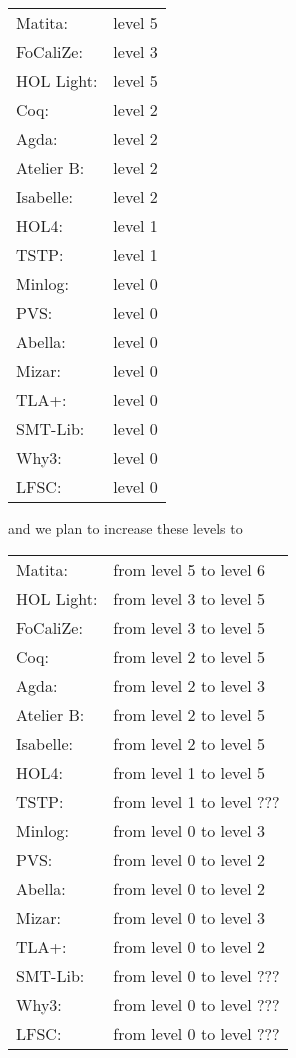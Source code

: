 \begin{tabular}{ll}
Matita:& level 5\\
FoCaliZe:& level 3\\
HOL Light:& level 5\\
Coq:& level 2\\
Agda:& level 2\\
Atelier B:& level 2\\
Isabelle:& level 2\\
HOL4:& level 1\\
TSTP:& level 1\\
Minlog:& level 0\\
PVS:& level 0\\
Abella:& level 0\\
Mizar:& level 0\\
TLA+:& level 0\\
SMT-Lib:& level 0\\
Why3:& level 0\\
LFSC:& level 0\\

\end{tabular}

and we plan to increase these levels to 

\begin{tabular}{ll}
Matita:& from level 5 to level 6\\
HOL Light:& from level 3 to level 5\\
FoCaliZe:& from level 3 to level 5\\
Coq:& from level 2 to level 5\\
Agda:& from level 2 to level 3\\
Atelier B:& from level 2 to level 5\\
Isabelle:& from level 2 to level 5\\
HOL4:& from level 1 to level 5\\
TSTP:& from level 1 to level ???\\
Minlog:& from level 0 to level 3\\
PVS:& from level 0 to level 2\\
Abella:& from level 0 to level 2\\
Mizar:& from level 0 to level 3\\
TLA+:& from level 0 to level 2\\
SMT-Lib:& from level 0 to level ???\\
Why3:& from level 0 to level ???\\
LFSC:& from level 0 to level ???\\

\end{tabular}

